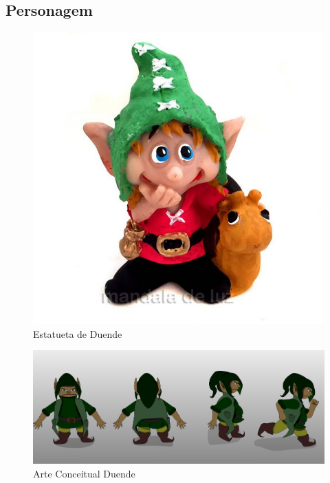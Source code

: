 \subsection{Personagem}

\begin{figure}[htb]
	\caption{\label{duendeRef}Estatueta de Duende}
	\begin{center}
	    \includegraphics[width=\textwidth/2]{imagens/duendeRef.jpg}
	\end{center}
\end{figure}



\begin{figure}[htb]
	\caption{\label{duendePos}Arte Conceitual Duende}
	\begin{center}
	    \includegraphics[width=\textwidth]{imagens/duendePosicoes.jpeg}
	\end{center}
\end{figure}


